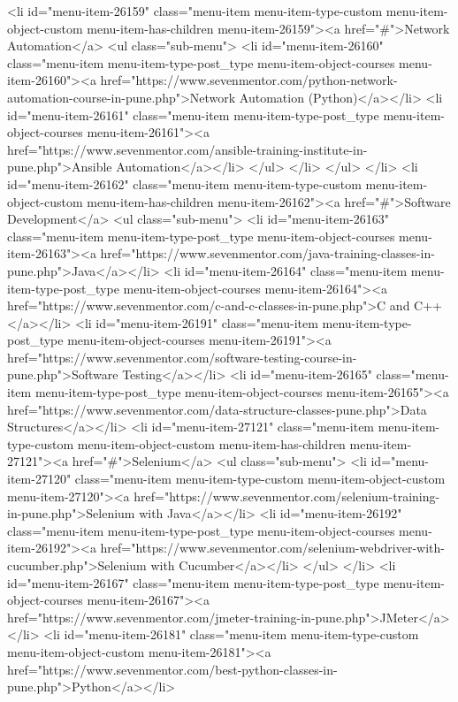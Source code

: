{<li id="menu-item-26159" class="menu-item menu-item-type-custom menu-item-object-custom menu-item-has-children menu-item-26159"><a href="#">Network Automation</a>
<ul class="sub-menu">
<li id="menu-item-26160" class="menu-item menu-item-type-post_type menu-item-object-courses menu-item-26160"><a href="https://www.sevenmentor.com/python-network-automation-course-in-pune.php">Network Automation (Python)</a></li>
<li id="menu-item-26161" class="menu-item menu-item-type-post_type menu-item-object-courses menu-item-26161"><a href="https://www.sevenmentor.com/ansible-training-institute-in-pune.php">Ansible Automation</a></li>
</ul>
</li>
</ul>
</li>
<li id="menu-item-26162" class="menu-item menu-item-type-custom menu-item-object-custom menu-item-has-children menu-item-26162"><a href="#">Software Development</a>
<ul class="sub-menu">
<li id="menu-item-26163" class="menu-item menu-item-type-post_type menu-item-object-courses menu-item-26163"><a href="https://www.sevenmentor.com/java-training-classes-in-pune.php">Java</a></li>
<li id="menu-item-26164" class="menu-item menu-item-type-post_type menu-item-object-courses menu-item-26164"><a href="https://www.sevenmentor.com/c-and-c-classes-in-pune.php">C and C++</a></li>
<li id="menu-item-26191" class="menu-item menu-item-type-post_type menu-item-object-courses menu-item-26191"><a href="https://www.sevenmentor.com/software-testing-course-in-pune.php">Software Testing</a></li>
<li id="menu-item-26165" class="menu-item menu-item-type-post_type menu-item-object-courses menu-item-26165"><a href="https://www.sevenmentor.com/data-structure-classes-pune.php">Data Structures</a></li>
<li id="menu-item-27121" class="menu-item menu-item-type-custom menu-item-object-custom menu-item-has-children menu-item-27121"><a href="#">Selenium</a>
<ul class="sub-menu">
<li id="menu-item-27120" class="menu-item menu-item-type-custom menu-item-object-custom menu-item-27120"><a href="https://www.sevenmentor.com/selenium-training-in-pune.php">Selenium with Java</a></li>
<li id="menu-item-26192" class="menu-item menu-item-type-post_type menu-item-object-courses menu-item-26192"><a href="https://www.sevenmentor.com/selenium-webdriver-with-cucumber.php">Selenium with Cucumber</a></li>
 </ul>
</li>
<li id="menu-item-26167" class="menu-item menu-item-type-post_type menu-item-object-courses menu-item-26167"><a href="https://www.sevenmentor.com/jmeter-training-in-pune.php">JMeter</a></li>
<li id="menu-item-26181" class="menu-item menu-item-type-custom menu-item-object-custom menu-item-26181"><a href="https://www.sevenmentor.com/best-python-classes-in-pune.php">Python</a></li>
}

